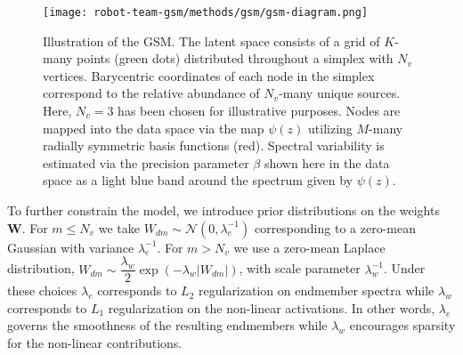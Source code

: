 \begin{figure}[H]
  \texttt{[image: robot-team-gsm/methods/gsm/gsm-diagram.png]}
  \caption{Illustration of the GSM. The latent space consists of a grid of
    $K$-many points (green dots) distributed throughout a simplex with $N_v$
    vertices. Barycentric coordinates of each node in the simplex correspond to
    the relative abundance of $N_v$-many unique sources. Here, $N_v=3$ has been
    chosen for illustrative purposes. Nodes are mapped into the data space via
    the map $\psi(z)$ utilizing $M$-many radially symmetric basis functions
    (red). Spectral variability is estimated via the precision parameter $\beta$
    shown here in the data space as a light blue band around the spectrum given
    by $\psi(z)$.}
  \label{fig:gsm-diagram}
\end{figure}

To further constrain the model, we introduce prior distributions on the weights
$\mathbf{W}$. For $m\leq N_v$ we take $W_{dm}\sim\mathcal{N}(0, \lambda_e^{-1})$
corresponding to a zero-mean Gaussian with variance $\lambda_e^{-1}$. For
$m>N_v$ we use a zero-mean Laplace distribution,
$W_{dm}\sim\dfrac{\lambda_w}{2}\exp(-\lambda_w\lvert W_{dm}\rvert)$, with scale
parameter $\lambda_w^{-1}$. Under these choices $\lambda_e$ corresponds to $L_2$
regularization on endmember spectra while $\lambda_w$ corresponds to $L_1$
regularization on the non-linear activations. In other words, $\lambda_e$
governs the smoothness of the resulting endmembers while $\lambda_w$ encourages
sparsity for the non-linear contributions.


